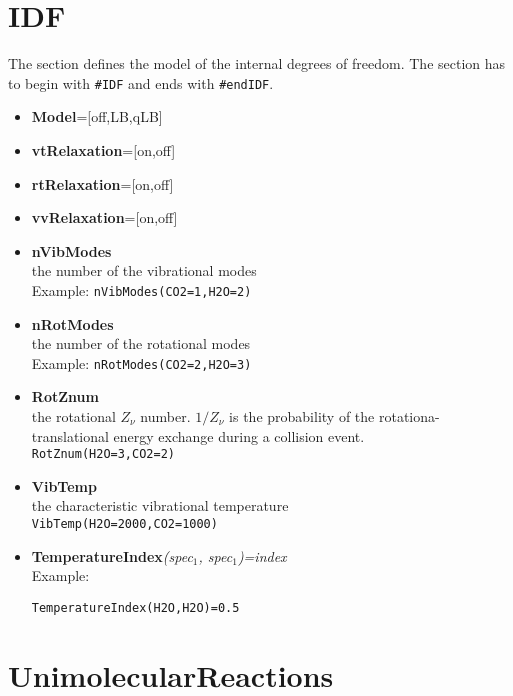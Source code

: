 \section{IDF}
The section defines the model of the internal degrees of freedom. The section has to begin with {\tt \#IDF} and ends with {\tt \#endIDF}. 

\begin{itemize}
\item {\bf Model}=[off,LB,qLB]
\item {\bf vtRelaxation}=[on,off]
\item {\bf rtRelaxation}=[on,off]
\item {\bf vvRelaxation}=[on,off]
\item {\bf nVibModes} \\ the number of the vibrational modes \\ Example: {\tt nVibModes(CO2=1,H2O=2)} 
\item {\bf nRotModes} \\ the number of the rotational modes \\ Example: {\tt nRotModes(CO2=2,H2O=3)}
\item {\bf RotZnum} \\ the rotational $Z_\nu$ number. $1/Z_\nu$ is the probability of the rotationa-translational energy exchange during a collision event. \\ {\tt RotZnum(H2O=3,CO2=2)}
\item {\bf VibTemp} \\ the characteristic vibrational temperature \\ {\tt  VibTemp(H2O=2000,CO2=1000)}

\item {\bf TemperatureIndex}{\it (spec$_1$, spec$_1$)=index} \\ Example:

{\tt TemperatureIndex(H2O,H2O)=0.5}

\end{itemize}




\section{UnimolecularReactions}

